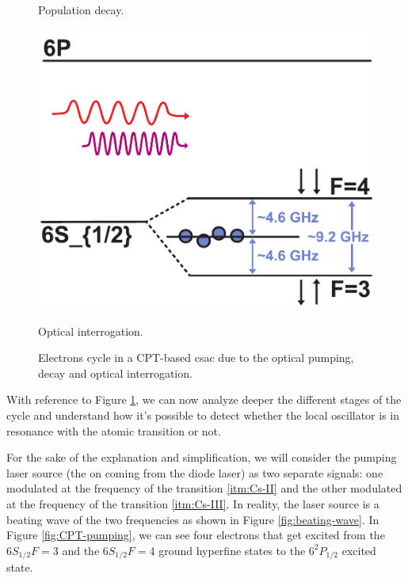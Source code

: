 \begin{figure}[H]
\begin{minipage}[t]{0.3\linewidth}
        \caption{Population decay.}
        \label{fig:CPT-decay}
    \end{minipage}
    \hfill
    \begin{minipage}[t]{0.3\linewidth}
        \centering
        \includegraphics[width=\linewidth]{pdf/CPT/interrogation.pdf}
        \caption{Optical interrogation.}
        \label{fig:CPT-interrogation}
    \end{minipage}

    \caption{Electrons cycle in a CPT-based \acrshort{csac} due to the optical pumping, decay and optical interrogation.}
    \label{fig:CPT-steps}
\end{figure}

With reference to Figure \ref{fig:CPT-steps}, we can now analyze deeper the different stages of the cycle and understand how it's possible to detect whether the local oscillator is in resonance with the atomic transition or not.

For the sake of the explanation and simplification, we will consider the pumping laser source (the on coming from the diode laser) as two separate signals: one modulated at the frequency of the transition \ref{itm:Cs-II} and the other modulated at the frequency of the transition \ref{itm:Cs-III}.
In reality, the laser source is a beating wave of the two frequencies as shown in Figure \ref{fig:beating-wave}.
In Figure \ref{fig:CPT-pumping}, we can see four electrons that get excited from the $6S_{1/2} F=3$ and the $6S_{1/2} F=4$ ground hyperfine states to the $6^2P_{1/2}$ excited state.


